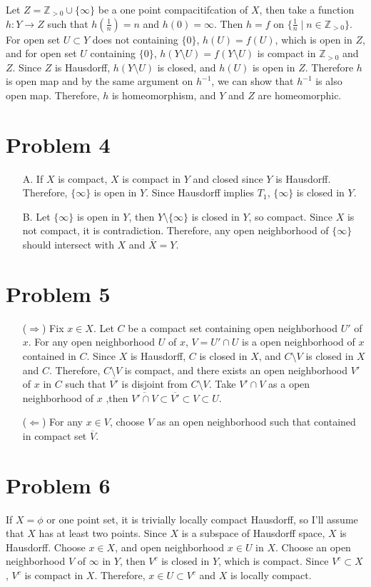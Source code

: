 \documentclass{article}
\begin{document}
Let $Z=\mathbb{Z}_{>0}\cup \{\infty\}$ be a one point compacitifcation of $X$, then take a function $h:Y\rightarrow Z$ such that $h(\frac{1}{n})=n$ and $h(0)=\infty$. Then $h=f$ on $\{\frac{1}{n} \mid n\in \mathbb{Z}_{>0}\}$. For open set $U\subset Y$ does not containing $\{0\}$, $h(U)=f(U)$, which is open in $Z$, and for open set $U$ containing $\{0\}$, $h(Y\setminus U)=f(Y\setminus U)$ is compact in $\mathbb{Z}_{>0}$ and $Z$. Since $Z$ is Hausdorff, $h(Y\setminus U)$ is closed, and $h(U)$ is open in $Z$. Therefore $h$ is open map and by the same argument on $h^{-1}$, we can show that $h^{-1}$ is also open map. Therefore, $h$ is homeomorphism, and $Y$ and $Z$ are homeomorphic.

\section*{Problem 4}
\begin{enumerate}
\item[A.] If $X$ is compact, $X$ is compact in $Y$ and closed since $Y$ is Hausdorff. Therefore, $\{\infty\}$ is open in $Y$. Since Hausdorff implies $T_1$, $\{\infty\}$ is closed in $Y$.
\item[B.] Let $\{\infty\}$ is open in $Y$, then $Y\setminus\{\infty\}$ is closed in $Y$, so compact. Since $X$ is not compact, it is contradiction. Therefore, any open neighborhood of $\{\infty\}$ should intersect with $X$ and $\overline{X}=Y$.
\end{enumerate}
\section*{Problem 5}
\begin{enumerate}
\item[($\Rightarrow$)] Fix $x\in X$. Let $C$ be a compact set containing open neighborhood $U'$ of $x$. For any open neighborhood $U$ of $x$, $V=U'\cap U$ is a open neighborhood of $x$ contained in $C$. Since $X$ is Hausdorff, $C$ is closed in $X$, and $C\setminus V$ is closed in $X$ and $C$. Therefore, $C\setminus V$ is compact, and there exists an open neighborhood $V'$ of $x$ in $C$ such that $\overline{V'}$ is disjoint from $C\setminus V$. Take $V'\cap V$ as a open neighborhood of $x$ ,then $\overline{V'\cap V}\subset \overline{V'}\subset V\subset U$.
\item[($\Leftarrow$)] For any $x\in V$, choose $V$ as an open neighborhood such that contained in compact set $\overline{V}$.
\end{enumerate}
\section*{Problem 6}
If $X=\phi$ or one point set, it is trivially locally compact Hausdorff, so I'll assume that $X$ has at least two points. Since $X$ is a subspace of Hausdorff space, $X$ is Hausdorff. Choose $x\in X$, and open neighborhood $x\in U$ in $X$. Choose an open neighborhood $V$ of $\infty$ in $Y$, then $V^c$ is closed in $Y$, which is compact. Since $V^c\subset X$, $V^c$ is compact in $X$. Therefore, $x\in U\subset V^c$ and $X$ is locally compact.
\end{document}
